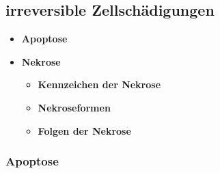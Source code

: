 \subsection{irreversible Zellschädigungen}
	\begin{itemize}
		\item \textbf{Apoptose}
		\item \textbf{Nekrose}
			\begin{itemize}
				\item \textbf{Kennzeichen der Nekrose}
				\item \textbf{Nekroseformen}
				\item \textbf{Folgen der Nekrose}
			\end{itemize}
	\end{itemize}

\subsubsection{Apoptose}
